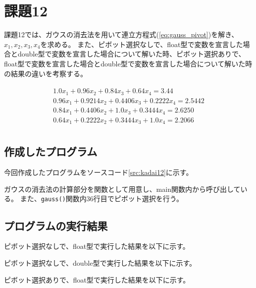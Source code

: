 \documentclass[11pt,titlepage]{jsarticle}
\begin{document}
\section{課題12}
課題12では、ガウスの消去法を用いて連立方程式(\ref{eq:gauss_pivot})を解き、$x_1, x_2, x_3, x_4$を求める。
また、ピボット選択なしで、float型で変数を宣言した場合とdouble型で変数を宣言した場合について解いた時、ピボット選択ありで、float型で変数を宣言した場合とdouble型で変数を宣言した場合について解いた時の結果の違いを考察する。


\begin{eqnarray}
\label{eq:gauss_pivot}
		\begin{array}{l}
			1.0x_1 + 0.96x_2 + 0.84x_3 + 0.64x_4 = 3.44\\
			0.96x_1 + 0.9214x_2 + 0.4406x_3 + 0.2222x_4 = 2.5442\\
			0.84x_1 + 0.4406x_2 + 1.0x_3 + 0.3444x_4 = 2.6250\\
			0.64x_1 + 0.2222x_2 + 0.3444x_3 + 1.0x_4 = 2.2066\\
		\end{array}
\end{eqnarray}

\subsection{作成したプログラム}
今回作成したプログラムをソースコード\ref{src:kadai12}に示す。


ガウスの消去法の計算部分を関数として用意し、main関数内から呼び出している。
また、{\tt gauss()}関数内36行目でピボット選択を行う。

\subsection{プログラムの実行結果}
ピボット選択なしで、float型で実行した結果を以下に示す。

\begin{oframed}
\end{oframed}

ピボット選択なしで、double型で実行した結果を以下に示す。

\begin{oframed}
\end{oframed}

ピボット選択ありで、float型で実行した結果を以下に示す。
\end{document}
